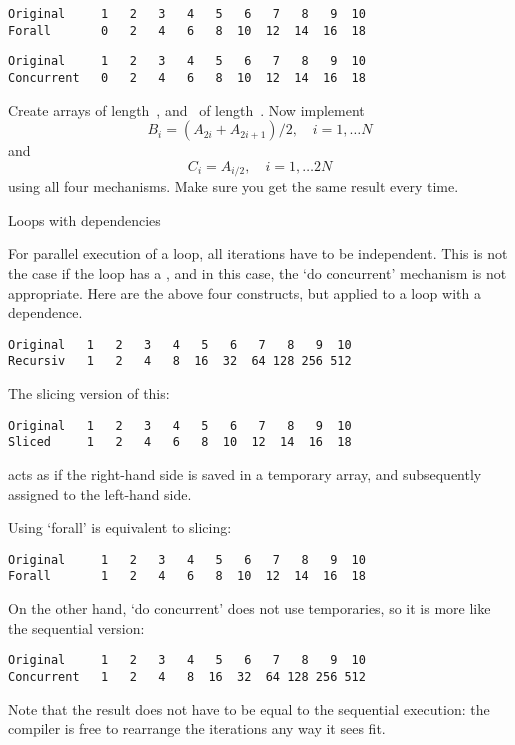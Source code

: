 \begin{verbatim}
Original     1   2   3   4   5   6   7   8   9  10
Forall       0   2   4   6   8  10  12  14  16  18
\end{verbatim}

\begin{verbatim}
Original     1   2   3   4   5   6   7   8   9  10
Concurrent   0   2   4   6   8  10  12  14  16  18
\end{verbatim}

\begin{exercise}
  Create arrays  of length~, and ~of length~.
  Now implement
  \[ B_i = (A_{2i}+A_{2i+1})/2,\quad i=1,\ldots N \]
  and
  \[ C_i = A_{i/2},\quad i=1,\ldots 2N \]
  using all four mechanisms. Make sure you get the same result every time.
\end{exercise}

 {Loops with dependencies}

For parallel execution of a loop, all iterations have to be independent.
This is not the case if the loop has a , and in
this case, the `do concurrent' mechanism is not appropriate.
%
Here are the above four constructs, but applied to a loop with a dependence.
%
%
\begin{verbatim}
Original   1   2   3   4   5   6   7   8   9  10
Recursiv   1   2   4   8  16  32  64 128 256 512
\end{verbatim}

The slicing version of this:
%
%
\begin{verbatim}
Original   1   2   3   4   5   6   7   8   9  10
Sliced     1   2   4   6   8  10  12  14  16  18
\end{verbatim}
%
acts as if the right-hand side is saved in a temporary array, and
subsequently assigned to the left-hand side.

Using `forall' is equivalent to slicing:
%
%
\begin{verbatim}
Original     1   2   3   4   5   6   7   8   9  10
Forall       1   2   4   6   8  10  12  14  16  18
\end{verbatim}

On the other hand, `do concurrent' does not use temporaries, so it is
more like the sequential version:
%
%
\begin{verbatim}
Original     1   2   3   4   5   6   7   8   9  10
Concurrent   1   2   4   8  16  32  64 128 256 512
\end{verbatim}
Note that the result does not have to be equal to the sequential
execution: the compiler is free to rearrange the iterations any way it
sees fit.

